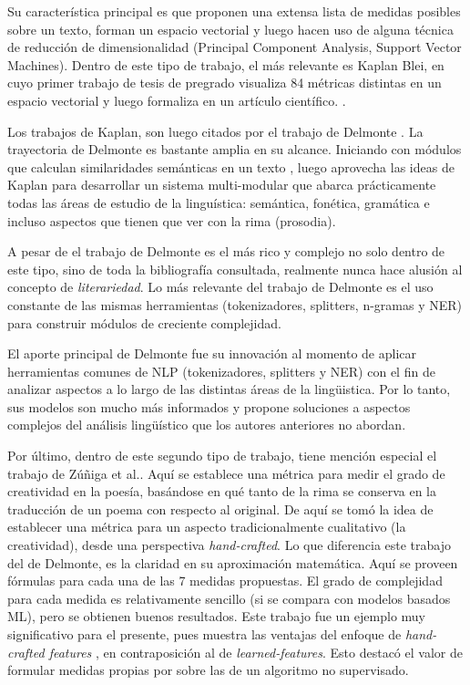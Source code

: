 \documentclass[12pt,letterpaper,twoside]{article}
\begin{document}
Su característica principal es que proponen una extensa lista de
medidas posibles sobre un texto, forman un espacio vectorial y luego
hacen uso de alguna técnica de reducción de dimensionalidad (Principal
Component Analysis, Support Vector Machines). Dentro de este tipo de
trabajo, el más relevante es Kaplan Blei, en cuyo primer trabajo
\cite{kaplan2006computational} de tesis de pregrado visualiza 84
métricas distintas en un espacio vectorial y luego formaliza en un
artículo científico. \cite{kaplan2007computational}.

Los trabajos de Kaplan, son luego citados por el trabajo de Delmonte
\cite{delmonte2013computing} \cite{delmonte2005venses}. La trayectoria
de Delmonte es bastante amplia en su alcance. Iniciando con módulos
que calculan similaridades semánticas en un texto \cite{delmonte2005venses},
luego aprovecha las ideas de Kaplan para desarrollar un sistema multi-modular
que abarca prácticamente todas las áreas de estudio de la linguística:
semántica, fonética, gramática e incluso aspectos que tienen que ver
con la rima (prosodia).

A pesar de el trabajo de Delmonte es el más rico y complejo no solo
dentro de este tipo, sino de toda la bibliografía consultada,
realmente nunca hace alusión al concepto de \emph{literariedad}. Lo más
relevante del trabajo de Delmonte es el uso constante de las mismas
herramientas (tokenizadores, splitters, n-gramas y NER) para construir
módulos de creciente complejidad. 


El aporte principal de Delmonte fue su innovación al momento de
aplicar herramientas comunes de NLP (tokenizadores, splitters y NER)
con el fin de analizar aspectos a lo largo de las distintas áreas de
la lingüistica. Por lo tanto, sus modelos son mucho más informados y
propone soluciones a aspectos complejos del análisis lingüístico que los
autores anteriores no abordan.

Por último, dentro de este segundo tipo de trabajo, tiene mención
especial el trabajo de Zúñiga et al.\cite{zuniga2017automatic}. Aquí
se establece una métrica para medir el grado de creatividad en la
poesía, basándose en qué tanto de la rima se conserva en la traducción
de un poema con respecto al original. De aquí se tomó la idea de
establecer una métrica para un aspecto tradicionalmente cualitativo
(la creatividad), desde una perspectiva \emph{hand-crafted}. Lo que
diferencia este trabajo del de Delmonte, es la claridad en su
aproximación matemática. Aquí se proveen fórmulas para cada una de las
7 medidas propuestas. El grado de complejidad para cada medida es
relativamente sencillo (si se compara con modelos basados ML), pero se
obtienen buenos resultados.  Este trabajo fue un ejemplo muy
significativo para el presente, pues muestra las ventajas del enfoque
de \emph{hand-crafted features} , en contraposición al de
\emph{learned-features}. Esto destacó el valor de formular medidas propias
por sobre las de un algoritmo no supervisado.
\end{document}
